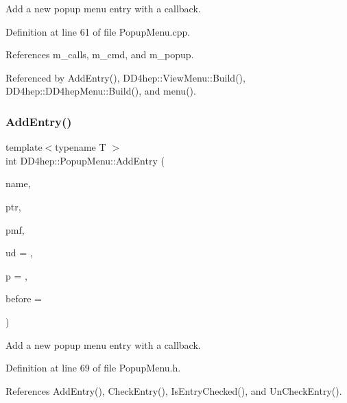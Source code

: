 Add a new popup menu entry with a callback. 



Definition at line 61 of file Popup\+Menu.\+cpp.



References m\+\_\+calls, m\+\_\+cmd, and m\+\_\+popup.



Referenced by Add\+Entry(), D\+D4hep\+::\+View\+Menu\+::\+Build(), D\+D4hep\+::\+D\+D4hep\+Menu\+::\+Build(), and menu().

\hypertarget{class_d_d4hep_1_1_popup_menu_ad08bf5896097b7d0cc241830c6952b45}{}\label{class_d_d4hep_1_1_popup_menu_ad08bf5896097b7d0cc241830c6952b45} 
\subsubsection{\texorpdfstring{Add\+Entry()}{AddEntry()}\hspace{0.1cm}{\footnotesize\ttfamily [2/2]}}
{\footnotesize\ttfamily template$<$typename T $>$ \\
int D\+D4hep\+::\+Popup\+Menu\+::\+Add\+Entry (\begin{DoxyParamCaption}\item[{const char $\ast$}]{name,  }\item[{\hyperlink{class_t}{T} $\ast$}]{ptr,  }\item[{void(T\+::$\ast$)(T\+G\+Menu\+Entry $\ast$, void $\ast$)}]{pmf,  }\item[{void $\ast$}]{ud = {},  }\item[{const T\+G\+Picture $\ast$}]{p = {},  }\item[{T\+G\+Menu\+Entry $\ast$}]{before = {} }\end{DoxyParamCaption})\hspace{0.3cm}{\ttfamily [inline]}}



Add a new popup menu entry with a callback. 



Definition at line 69 of file Popup\+Menu.\+h.



References Add\+Entry(), Check\+Entry(), Is\+Entry\+Checked(), and Un\+Check\+Entry().

\hypertarget{class_d_d4hep_1_1_popup_menu_ab142c9486f37c01153674a6749d392dd}{}\label{class_d_d4hep_1_1_popup_menu_ab142c9486f37c01153674a6749d392dd} 
